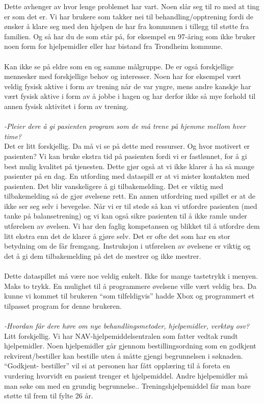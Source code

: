 Dette avhenger av hvor lenge problemet har vart. Noen slår seg til ro med at ting er som det er. Vi har brukere som takker nei til behandling/opptrening fordi de ønsker å klare seg med den hjelpen de har fra kommunen i tillegg til støtte fra familien. Og så har du de som står på, for eksempel en 97-åring som ikke bruker noen form for hjelpemidler eller har bistand fra Trondheim kommune.\\ \\
Kan ikke se på eldre som en og samme målgruppe. De er også forskjellige mennesker med forskjellige behov og interesser. Noen har for eksempel vært veldig fysisk aktive i form av trening når de var yngre, mens andre kanskje har vært fysisk aktive i form av å jobbe i hagen og har derfor ikke så mye forhold til annen fysisk aktivitet i form av trening.\\ \\ 
\emph{-Pleier dere å gi pasienten program som de må trene på hjemme mellom hver time?} \\
Det er litt forskjellig. Da må vi se på dette med ressurser. Og hvor motivert er pasienten? Vi kan bruke ekstra tid på pasienten fordi vi er fastlønnet, for å gi best mulig kvalitet på tjenesten. Dette gjør også at vi ikke klarer å ha så mange pasienter på en dag. En utfording med dataspill er at vi mister kontakten med pasienten. Det blir vanskeligere å gi tilbakemelding. Det er viktig med tilbakemelding så de gjør øvelsene rett. En annen utfordring med spillet er at de ikke ser seg selv i bevegelse. Når vi er til stede så kan vi utfordre pasienten (med tanke på balansetrening) og vi kan også sikre pasienten til å ikke ramle under utførelsen av øvelsen. Vi har den faglig kompetansen og blikket til å utfordre dem litt ekstra enn det de klarer å gjøre selv. Det er ofte det som har en stor betydning om de får fremgang. Instruksjon i utførelsen av øvelsene er viktig og det å gi dem tilbakemelding på det de mestrer og ikke mestrer.  \\ \\
Dette dataspillet må være noe veldig enkelt. Ikke for mange tastetrykk i menyen. Maks to trykk. En mulighet til å programmere øvelsene ville vært veldig bra. Da kunne vi kommet til brukeren “som tilfeldigvis” hadde Xbox og programmert et tilpasset program for denne brukeren. \\ \\
\emph{-Hvordan får dere høre om nye behandlingsmetoder, hjelpemidler, verktøy osv?}\\
Litt forskjellig. Vi har NAV-hjelpemiddelsentralen som fatter vedtak rundt hjelpemidler. Noen hjelpemidler går gjennom bestillingsordning som en godkjent rekvirent/bestiller kan bestille uten å måtte gjengi begrunnelsen i søknaden. “Godkjent- bestiller” vil si at personen har fått opplæring til å foreta en vurdering hvorvidt en pasient trenger et hjelpemiddel. Andre hjelpemidler må man søke om med en grundig begrunnelse.. Treningshjelpemiddel får man bare støtte til frem til fylte 26 år. \\ \\
